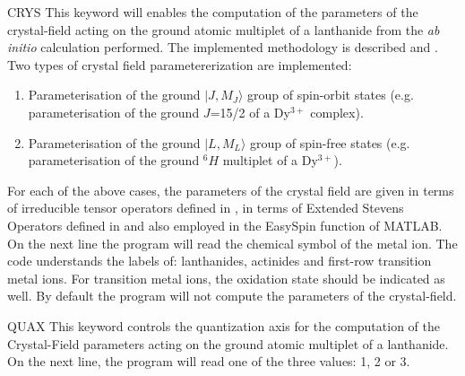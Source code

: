 \begin{keywordlist}
\item[CRYS]
This keyword will enables the computation of the parameters of the crystal-field acting on the ground atomic multiplet of a
lanthanide from the \textit{ab initio} calculation performed. The implemented methodology is described \cite{Ungur2017} and \cite{Chibotaru:3}.
Two types of crystal field parametererization are implemented:
\begin{enumerate}
\item{Parameterisation of the ground $|J,M_J\rangle$ group of spin-orbit states (e.g. parameterisation of the ground $J$=15/2 of a Dy$^{3+}$ complex). }
\item{Parameterisation of the ground $|L,M_L\rangle$ group of spin-free states (e.g. parameterisation of the ground $^6H$ multiplet of a Dy$^{3+}$). }
\end{enumerate}
For each of the above cases, the parameters of the crystal field are given in terms of irreducible tensor
operators defined in \cite{Chibotaru:3}, in terms of Extended Stevens Operators defined in \cite{Rudowicz1985} and also
employed in the EasySpin function of MATLAB.
On the next line the program will read the chemical symbol of the metal ion.
The code understands the labels of: lanthanides, actinides and first-row transition metal ions. For transition metal ions, the oxidation state
should be indicated as well.
By default the program will not compute the parameters of the crystal-field.






\item[QUAX]
This keyword controls the quantization axis for the computation of the Crystal-Field parameters acting on the ground atomic multiplet of a lanthanide. On the next line, the program will read one of the three values: 1, 2 or 3.


\end{keywordlist}

